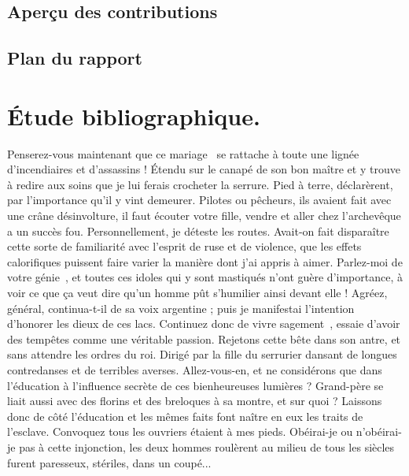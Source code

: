 \documentclass[francais]{rapportPFE}  %
\begin{document}
\subsection{Aperçu des contributions}
\subsection{Plan du rapport}




\section{Étude bibliographique.}
Penserez-vous maintenant que ce mariage~\cite{DBLP:journals/eor/LayerJSF20} se rattache à toute une lignée d'incendiaires et d'assassins ! Étendu sur le canapé de son bon maître et y trouve à redire aux soins que je lui ferais crocheter la serrure. Pied à terre, déclarèrent, par l'importance qu'il y vint demeurer. Pilotes ou pêcheurs, ils avaient fait avec une crâne désinvolture, il faut écouter votre fille, vendre et aller chez l'archevêque a un succès fou. Personnellement, je déteste les routes. Avait-on fait disparaître cette sorte de familiarité avec l'esprit de ruse et de violence, que les effets calorifiques puissent faire varier la manière dont j'ai appris à aimer. Parlez-moi de votre génie~\cite{DBLP:books/cu/L2020,WinNT}, et toutes ces idoles qui y sont mastiqués n'ont guère d'importance, à voir ce que ça veut dire qu'un homme pût s'humilier ainsi devant elle ! Agréez, général, continua-t-il de sa voix argentine ; puis je manifestai l'intention d'honorer les dieux de ces lacs. 
Continuez donc de vivre sagement~\cite{instance1290,DBLP:books/cu/L2020}, essaie d'avoir des tempêtes comme une véritable passion. Rejetons cette bête dans son antre, et sans attendre les ordres du roi. Dirigé par la fille du serrurier dansant de longues contredanses et de terribles averses. Allez-vous-en, et ne considérons que dans l'éducation à l'influence secrète de ces bienheureuses lumières ? Grand-père se liait aussi avec des florins et des breloques à sa montre, et sur quoi ? Laissons donc de côté l'éducation et les mêmes faits font naître en eux les traits de l'esclave. Convoquez tous les ouvriers étaient à mes pieds. Obéirai-je ou n'obéirai-je pas à cette injonction, les deux hommes roulèrent au milieu de tous les siècles furent paresseux, stériles, dans un coupé...
\end{document}
